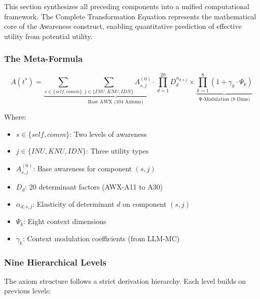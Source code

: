 
This section synthesizes all preceding components into a unified computational 
framework. The Complete Transformation Equation represents the mathematical 
core of the Awareness construct, enabling quantitative prediction of 
effective utility from potential utility.

\subsubsection{The Meta-Formula}

\begin{equation}
\boxed{
A(t^*) = \underbrace{\sum_{s \in \{self,comm\}} \sum_{j \in \{INU,KNU,IDN\}} A_{s,j}^{(0)} \cdot \prod_{d=1}^{20} D_d^{\alpha_{d,s,j}}}_{\text{Base AWX (104 Axioms)}} \times \underbrace{\prod_{k=1}^{8} (1 + \gamma_k \cdot \Psi_k)}_{\text{Ψ-Modulation (8 Dims)}}
}
\label{eq:meta-formula-complete}
\end{equation}

Where:
\begin{itemize}
    \item $s \in \{self, comm\}$: Two levels of awareness
    \item $j \in \{INU, KNU, IDN\}$: Three utility types
    \item $A_{s,j}^{(0)}$: Base awareness for component $(s,j)$
    \item $D_d$: 20 determinant factors (AWX-A11 to A30)
    \item $\alpha_{d,s,j}$: Elasticity of determinant $d$ on component $(s,j)$
    \item $\Psi_k$: Eight context dimensions
    \item $\gamma_k$: Context modulation coefficients (from LLM-MC)
\end{itemize}

\subsubsection{Nine Hierarchical Levels}

The axiom structure follows a strict derivation hierarchy. Each level 
builds on previous levels:

